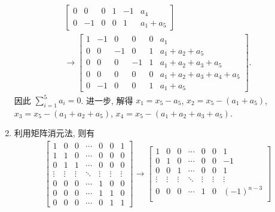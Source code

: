 \documentclass[a4paper, 11pt]{ctexart}
\begin{document}
\begin{enumerate}
\begin{gather*}
\begin{bmatrix}
                    0 & 0 & 0 & 1 & -1 & a_4 \\
                    0 & -1 & 0 & 0 & 1 & a_1 + a_5
                \end{bmatrix} \\
                \rightarrow \begin{bmatrix}
                    1 & -1 & 0 & 0 & 0 & a_1 \\
                    0 & 0 & -1 & 0 & 1 & a_1 + a_2 + a_5 \\
                    0 & 0 & 0 & -1 & 1 & a_1 + a_2 + a_3 + a_5 \\ 
                    0 & 0 & 0 & 0 & 0 & a_1 + a_2 + a_3 + a_4 + a_5\\
                    0 & -1 & 0 & 0 & 1 & a_1 + a_5
                \end{bmatrix}.
            \end{gather*}
            因此 $\sum\limits_{i=1}^5a_i = 0$. 进一步, 解得 $x_1 = x_5 - a_5$, $x_2 = x_5 - (a_1 + a_5)$, $x_3 = x_5 - (a_1 + a_2 + a_5)$, $x_4 = x_5 - (a_1 + a_2 + a_3 + a_5)$.
        \item %
            利用矩阵消元法, 则有
            \begin{gather*}
                \begin{bmatrix}
                    1 & 0 & 0 & \cdots & 0 & 0 & 1 \\
                    1 & 1 & 0 & \cdots & 0 & 0 & 0 \\
                    0 & 1 & 1 & \cdots & 0 & 0 & 0 \\
                    \vdots & \vdots & \vdots & \ddots & \vdots & \vdots & \vdots \\
                    0 & 0 & 0 & \cdots & 1 & 0 & 0 \\
                    0 & 0 & 0 & \cdots & 1 & 1 & 0 \\
                    0 & 0 & 0 & \cdots & 0 & 1 & 1
                \end{bmatrix}
                \rightarrow
                \begin{bmatrix}
                    1 & 0 & 0 & \cdots & 0 & 0 & 1 \\
                    0 & 1 & 0 & \cdots & 0 & 0 & -1 \\
                    0 & 0 & 1 & \cdots & 0 & 0 & 1 \\
                    \vdots & \vdots & \vdots & \ddots & \vdots & \vdots & \vdots \\
                    0 & 0 & 0 & \cdots & 1 & 0 & (-1)^{n-3} \\

\end{bmatrix}
\end{gather*}
\end{enumerate}
\end{document}
